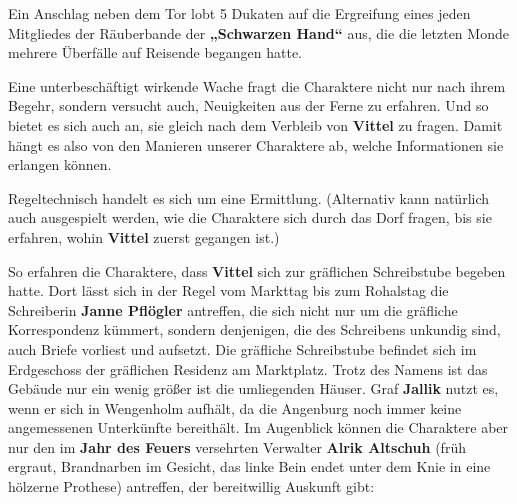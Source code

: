 	Ein Anschlag neben dem Tor lobt 5 Dukaten auf die Ergreifung eines jeden Mitgliedes der Räuberbande der \textbf{„Schwarzen Hand“} aus, die die letzten Monde mehrere Überfälle auf Reisende begangen hatte.
	
	Eine unterbeschäftigt wirkende Wache fragt die Charaktere nicht nur nach ihrem Begehr, sondern versucht auch, Neuigkeiten aus der Ferne zu erfahren.
	Und so bietet es sich auch an, sie gleich nach dem Verbleib von \textbf{Vittel} zu fragen.
	Damit hängt es also von den Manieren unserer Charaktere ab, welche Informationen sie erlangen können. 

Regeltechnisch handelt es sich um eine Ermittlung.
(Alternativ kann natürlich auch ausgespielt werden, wie die Charaktere sich durch das Dorf fragen, bis sie erfahren, wohin \textbf{Vittel} zuerst gegangen ist.)



So erfahren die Charaktere, dass \textbf{Vittel} sich zur gräflichen Schreibstube begeben hatte.
Dort lässt sich in der Regel vom Markttag bis zum Rohalstag die Schreiberin \textbf{Janne Pflögler} antreffen, die sich nicht nur um die gräfliche Korrespondenz kümmert, sondern denjenigen, die des Schreibens unkundig sind, auch Briefe vorliest und aufsetzt.
Die gräfliche Schreibstube befindet sich im Erdgeschoss der gräflichen Residenz am Marktplatz.
Trotz des Namens ist das Gebäude nur ein wenig größer ist die umliegenden Häuser.
Graf \textbf{Jallik} nutzt es, wenn er sich in Wengenholm aufhält, da die Angenburg noch immer keine angemessenen Unterkünfte bereithält.
Im Augenblick können die Charaktere aber nur den im \textbf{Jahr des Feuers} versehrten Verwalter \textbf{Alrik Altschuh} (früh ergraut, Brandnarben im Gesicht, das linke Bein endet unter dem Knie in eine hölzerne Prothese) antreffen, der bereitwillig Auskunft gibt:


